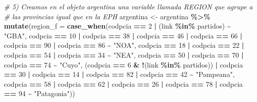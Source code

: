 \documentclass[
]{article}
\newenvironment{Shaded}{\begin{snugshade}}{\end{snugshade}}
\newcommand{\AttributeTok}[1]{\textcolor[rgb]{0.13,0.29,0.53}{#1}}
\newcommand{\CommentTok}[1]{\textcolor[rgb]{0.56,0.35,0.01}{\textit{#1}}}
\newcommand{\DecValTok}[1]{\textcolor[rgb]{0.00,0.00,0.81}{#1}}
\newcommand{\FunctionTok}[1]{\textcolor[rgb]{0.13,0.29,0.53}{\textbf{#1}}}
\newcommand{\NormalTok}[1]{#1}
\newcommand{\OtherTok}[1]{\textcolor[rgb]{0.56,0.35,0.01}{#1}}
\newcommand{\SpecialCharTok}[1]{\textcolor[rgb]{0.81,0.36,0.00}{\textbf{#1}}}
\newcommand{\StringTok}[1]{\textcolor[rgb]{0.31,0.60,0.02}{#1}}
\begin{document}
\begin{Shaded}
\begin{Highlighting}[]
\CommentTok{\# 5) Creamos en el objeto \textquotesingle{}argentina\textquotesingle{} una variable llamada REGION que agrupe a}
\CommentTok{\# las provincias igual que en la EPH}
\NormalTok{argentina }\OtherTok{\textless{}{-}}\NormalTok{ argentina }\SpecialCharTok{\%\textgreater{}\%}
    \FunctionTok{mutate}\NormalTok{(}\AttributeTok{region\_f =} \FunctionTok{case\_when}\NormalTok{(codpcia }\SpecialCharTok{==} \DecValTok{2} \SpecialCharTok{|}\NormalTok{ (link }\SpecialCharTok{\%in\%}\NormalTok{ partidos) }\SpecialCharTok{\textasciitilde{}} \StringTok{"GBA"}\NormalTok{, codpcia }\SpecialCharTok{==}
        \DecValTok{10} \SpecialCharTok{|}\NormalTok{ codpcia }\SpecialCharTok{==} \DecValTok{38} \SpecialCharTok{|}\NormalTok{ codpcia }\SpecialCharTok{==} \DecValTok{46} \SpecialCharTok{|}\NormalTok{ codpcia }\SpecialCharTok{==} \DecValTok{66} \SpecialCharTok{|}\NormalTok{ codpcia }\SpecialCharTok{==} \DecValTok{90} \SpecialCharTok{|}\NormalTok{ codpcia }\SpecialCharTok{==}
        \DecValTok{86} \SpecialCharTok{\textasciitilde{}} \StringTok{"NOA"}\NormalTok{, codpcia }\SpecialCharTok{==} \DecValTok{18} \SpecialCharTok{|}\NormalTok{ codpcia }\SpecialCharTok{==} \DecValTok{22} \SpecialCharTok{|}\NormalTok{ codpcia }\SpecialCharTok{==} \DecValTok{54} \SpecialCharTok{|}\NormalTok{ codpcia }\SpecialCharTok{==} \DecValTok{34} \SpecialCharTok{\textasciitilde{}}
        \StringTok{"NEA"}\NormalTok{, codpcia }\SpecialCharTok{==} \DecValTok{50} \SpecialCharTok{|}\NormalTok{ codpcia }\SpecialCharTok{==} \DecValTok{70} \SpecialCharTok{|}\NormalTok{ codpcia }\SpecialCharTok{==} \DecValTok{74} \SpecialCharTok{\textasciitilde{}} \StringTok{"Cuyo"}\NormalTok{, (codpcia }\SpecialCharTok{==}
        \DecValTok{6} \SpecialCharTok{\&} \SpecialCharTok{!}\NormalTok{(link }\SpecialCharTok{\%in\%}\NormalTok{ partidos)) }\SpecialCharTok{|}\NormalTok{ codpcia }\SpecialCharTok{==} \DecValTok{30} \SpecialCharTok{|}\NormalTok{ codpcia }\SpecialCharTok{==} \DecValTok{14} \SpecialCharTok{|}\NormalTok{ codpcia }\SpecialCharTok{==} \DecValTok{82} \SpecialCharTok{|}
\NormalTok{        codpcia }\SpecialCharTok{==} \DecValTok{42} \SpecialCharTok{\textasciitilde{}} \StringTok{"Pampeana"}\NormalTok{, codpcia }\SpecialCharTok{==} \DecValTok{58} \SpecialCharTok{|}\NormalTok{ codpcia }\SpecialCharTok{==} \DecValTok{62} \SpecialCharTok{|}\NormalTok{ codpcia }\SpecialCharTok{==} \DecValTok{26} \SpecialCharTok{|}
\NormalTok{        codpcia }\SpecialCharTok{==} \DecValTok{78} \SpecialCharTok{|}\NormalTok{ codpcia }\SpecialCharTok{==} \DecValTok{94} \SpecialCharTok{\textasciitilde{}} \StringTok{"Patagonia"}\NormalTok{))}


\end{Highlighting}
\end{Shaded}
\end{document}
